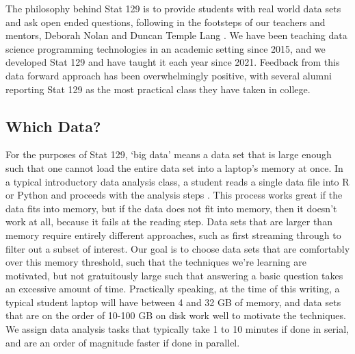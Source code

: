 \documentclass[12pt]{article}
\begin{document}
The philosophy behind Stat 129 is to provide students with real world data sets and ask open ended questions, following in the footsteps of our teachers and mentors, Deborah Nolan and Duncan Temple Lang \cite{nolan2010computing}.
We have been teaching data science programming technologies in an academic setting since 2015, and we developed Stat 129 and have taught it each year since 2021.
Feedback from this data forward approach has been overwhelmingly positive, with several alumni reporting Stat 129 as the most practical class they have taken in college.

\subsection{Which Data?}
\label{sec:data}

For the purposes of Stat 129, `big data' means a data set that is large enough such that one cannot load the entire data set into a laptop's memory at once.
In a typical introductory data analysis class, a student reads a single data file into R or Python and proceeds with the analysis steps \cite{wickham2023r}.
This process works great if the data fits into memory, but if the data does not fit into memory, then it doesn't work at all, because it fails at the reading step.
Data sets that are larger than memory require entirely different approaches, such as first streaming through to filter out a subset of interest.
Our goal is to choose data sets that are comfortably over this memory threshold, such that the techniques we're learning are motivated, but not gratuitously large such that answering a basic question takes an excessive amount of time.
Practically speaking, at the time of this writing, a typical student laptop will have between 4 and 32 GB of memory, and data sets that are on the order of 10-100 GB on disk work well to motivate the techniques.
We assign data analysis tasks that typically take 1 to 10 minutes if done in serial, and are an order of magnitude faster if done in parallel.
\end{document}
